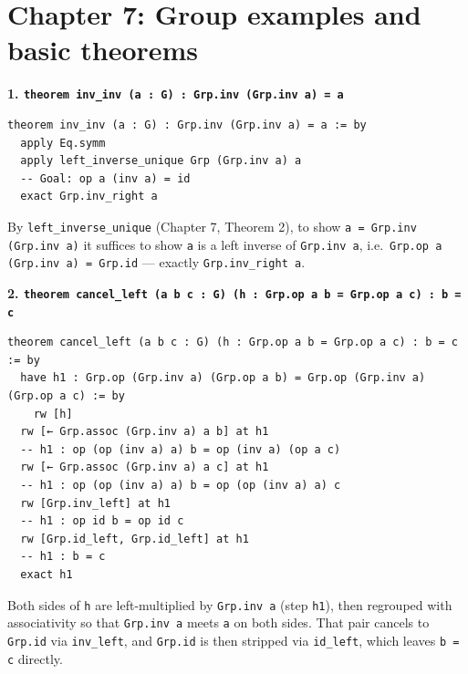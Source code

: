 \section{Chapter 7: Group examples and basic theorems}\label{sec:14-appendix-solutions:06-chapter-7:1}

\textbf{1. \texttt{theorem inv\_\allowbreak{}inv (a : G) : Grp.inv (Grp.inv a) = a}}

\begin{lstlisting}
theorem inv_inv (a : G) : Grp.inv (Grp.inv a) = a := by
  apply Eq.symm
  apply left_inverse_unique Grp (Grp.inv a) a
  -- Goal: op a (inv a) = id
  exact Grp.inv_right a
\end{lstlisting}

By \texttt{left\_\allowbreak{}inverse\_\allowbreak{}unique} (Chapter 7, Theorem 2), to show \texttt{a = Grp.inv (Grp.inv a)} it suffices to show \texttt{a} is a left inverse of \texttt{Grp.inv a}, i.e.~\texttt{Grp.op a (Grp.inv a) = Grp.id} --- exactly \texttt{Grp.inv\_\allowbreak{}right a}.

\textbf{2. \texttt{theorem cancel\_\allowbreak{}left (a b c : G) (h : Grp.op a b = Grp.op a c) : b = c}}

\begin{lstlisting}
theorem cancel_left (a b c : G) (h : Grp.op a b = Grp.op a c) : b = c := by
  have h1 : Grp.op (Grp.inv a) (Grp.op a b) = Grp.op (Grp.inv a) (Grp.op a c) := by
    rw [h]
  rw [← Grp.assoc (Grp.inv a) a b] at h1
  -- h1 : op (op (inv a) a) b = op (inv a) (op a c)
  rw [← Grp.assoc (Grp.inv a) a c] at h1
  -- h1 : op (op (inv a) a) b = op (op (inv a) a) c
  rw [Grp.inv_left] at h1
  -- h1 : op id b = op id c
  rw [Grp.id_left, Grp.id_left] at h1
  -- h1 : b = c
  exact h1
\end{lstlisting}

Both sides of \texttt{h} are left-multiplied by \texttt{Grp.inv a} (step \texttt{h1}), then regrouped with associativity so that \texttt{Grp.inv a} meets \texttt{a} on both sides. That pair cancels to \texttt{Grp.id} via \texttt{inv\_\allowbreak{}left}, and \texttt{Grp.id} is then stripped via \texttt{id\_\allowbreak{}left}, which leaves \texttt{b = c} directly.
